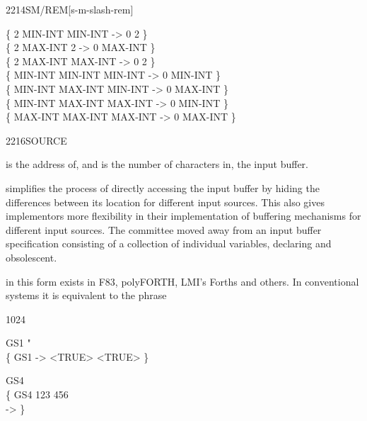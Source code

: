 \begin{worddef}{2214}{SM/REM}[s-m-slash-rem]
\begin{defer}
		\{       2 MIN-INT  MIN-INT  ->  0       2 \} \\
		\{       2 MAX-INT        2  ->  0 MAX-INT \} \\
		\{       2 MAX-INT  MAX-INT  ->  0       2 \} \\
		\{ MIN-INT MIN-INT  MIN-INT  ->  0 MIN-INT \} \\
		\{ MIN-INT MAX-INT  MIN-INT  ->  0 MAX-INT \} \\
		\{ MIN-INT MAX-INT  MAX-INT  ->  0 MIN-INT \} \\
		\{ MAX-INT MAX-INT  MAX-INT  ->  0 MAX-INT \}
	\end{defer}
\end{worddef}


\begin{worddef}{2216}{SOURCE}
\item {}

	 is the address of, and  is the number of
	characters in, the input buffer.

	\begin{defer}
	\rationale %
		 simplifies the process of directly accessing the
		input buffer by hiding the differences between its location
		for different input sources. This also gives implementors more
		flexibility in their implementation of buffering mechanisms
		for different input sources. The committee moved away from an
		input buffer specification consisting of a collection of
		individual variables, declaring  and 
		obsolescent.

		 in this form exists in F83, polyFORTH, LMI's
		Forths and others. In conventional systems it is equivalent to
		the phrase

		\tab {}  
			   1024
			  

	\testing
		\word{:} GS1  "  
			   \word{=} \word{Rfrom}  \word{=} \word{;} \\
		\{ GS1 -> <TRUE> <TRUE> \}

		\word{:} GS4   \word{!}  \word{;} \\
		\{ GS4 123 456 \\
		-> \}
	\end{defer}
\end{worddef}


